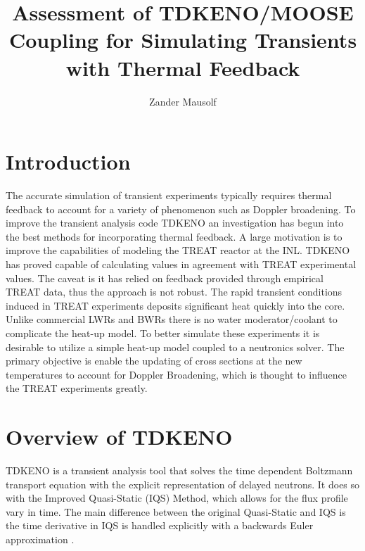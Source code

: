 \documentclass[11pt]{article}
\begin{document}
%
\author{Zander Mausolf}
\title{Assessment of TDKENO/MOOSE Coupling for Simulating Transients with Thermal Feedback}
\maketitle

\section{Introduction}
The accurate simulation of transient experiments typically requires thermal feedback to account for a variety of phenomenon such as Doppler broadening. To improve the transient analysis code TDKENO an investigation has begun into the best methods for incorporating thermal feedback. A large motivation is to improve the capabilities of modeling the TREAT reactor at the INL. TDKENO has proved capable of calculating values in agreement with TREAT experimental values.  The caveat is it has relied on feedback provided through empirical TREAT data, thus the approach is not robust.
The rapid transient conditions induced in TREAT experiments deposits significant heat quickly into the core.  Unlike commercial LWRs and BWRs there is no water moderator/coolant to complicate the heat-up model.  To better simulate these experiments it is desirable to utilize a simple heat-up model coupled to a neutronics solver. The primary objective is enable the updating of cross sections at the new temperatures to account for Doppler Broadening, which is thought to influence the TREAT experiments greatly.  

\section{Overview of TDKENO}

TDKENO is a transient analysis tool that solves the time dependent Boltzmann transport equation with the explicit representation of delayed neutrons. It does so with the Improved Quasi-Static (IQS) Method, which allows for the flux profile vary in time.  The main difference between the original Quasi-Static and IQS is the time derivative in IQS is handled explicitly with a backwards Euler approximation \cite{goluoglu2001time}. 
\end{document}
